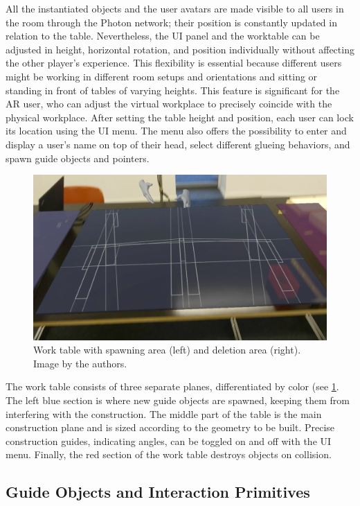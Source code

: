 \documentclass[10pt,twocolumn,letterpaper,english]{article}
\begin{document}
All the instantiated objects and the user avatars are made visible to all users in the room through the Photon network; their position is constantly updated in relation to the table. Nevertheless, the UI panel and the worktable can be adjusted in height, horizontal rotation, and position individually without affecting the other player's experience. This flexibility is essential because different users might be working in different room setups and orientations and sitting or standing in front of tables of varying heights. This feature is significant for the AR user, who can adjust the virtual workplace to precisely coincide with the physical workplace. After setting the table height and position, each user can lock its location using the UI menu. The menu also offers the possibility to enter and display a user's name on top of their head, select different glueing behaviors, and spawn guide objects and pointers.


\begin{figure}[!htp]
    \centering
    \includegraphics[width=1\linewidth]{Workplane.png}
    \caption{Work table with spawning area (left) and deletion area (right). Image by the authors.}
    \label{fig:workplane}
\end{figure}


The work table consists of three separate planes, differentiated by color (see \cref{fig:workplane}. The left blue section is where new guide objects are spawned, keeping them from interfering with the construction. The middle part of the table is the main construction plane and is sized according to the geometry to be built. Precise construction guides, indicating angles, can be toggled on and off with the UI menu. Finally, the red section of the work table destroys objects on collision.

\subsection{Guide Objects and Interaction Primitives}
\end{document}

